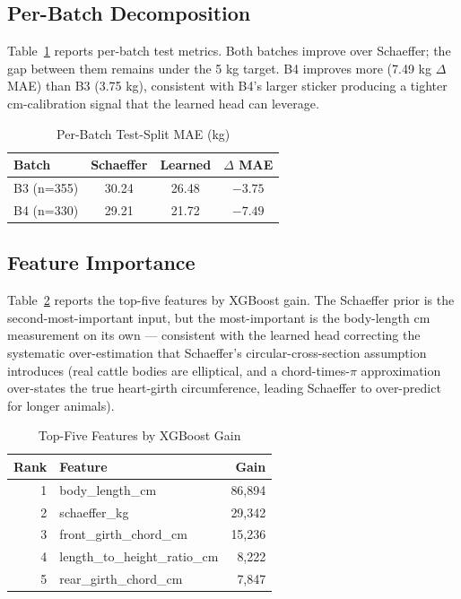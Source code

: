 \documentclass[conference]{IEEEtran}
\begin{document}
\subsection{Per-Batch Decomposition}

Table~\ref{tab:perbatch} reports per-batch test metrics. Both batches improve over Schaeffer; the gap between them remains under the 5 kg target. B4 improves more (7.49 kg $\Delta$MAE) than B3 (3.75 kg), consistent with B4's larger sticker producing a tighter cm-calibration signal that the learned head can leverage.

\begin{table}[!t]
\caption{Per-Batch Test-Split MAE (kg)}
\label{tab:perbatch}
\centering
\begin{tabular}{lccc}
\toprule
\textbf{Batch} & \textbf{Schaeffer} & \textbf{Learned} & \textbf{$\Delta$ MAE} \\
\midrule
B3 (n=355) & 30.24 & 26.48 & $-3.75$ \\
B4 (n=330) & 29.21 & 21.72 & $-7.49$ \\
\bottomrule
\end{tabular}
\end{table}

\subsection{Feature Importance}

Table~\ref{tab:fi} reports the top-five features by XGBoost gain. The Schaeffer prior is the second-most-important input, but the most-important is the body-length cm measurement on its own --- consistent with the learned head correcting the systematic over-estimation that Schaeffer's circular-cross-section assumption introduces (real cattle bodies are elliptical, and a chord-times-$\pi$ approximation over-states the true heart-girth circumference, leading Schaeffer to over-predict for longer animals).

\begin{table}[!t]
\caption{Top-Five Features by XGBoost Gain}
\label{tab:fi}
\centering
\begin{tabular}{rlr}
\toprule
\textbf{Rank} & \textbf{Feature} & \textbf{Gain} \\
\midrule
1 & body\_length\_cm           & 86,894 \\
2 & schaeffer\_kg              & 29,342 \\
3 & front\_girth\_chord\_cm    & 15,236 \\
4 & length\_to\_height\_ratio\_cm & 8,222 \\
5 & rear\_girth\_chord\_cm     & 7,847 \\
\bottomrule
\end{tabular}
\end{table}
\end{document}
